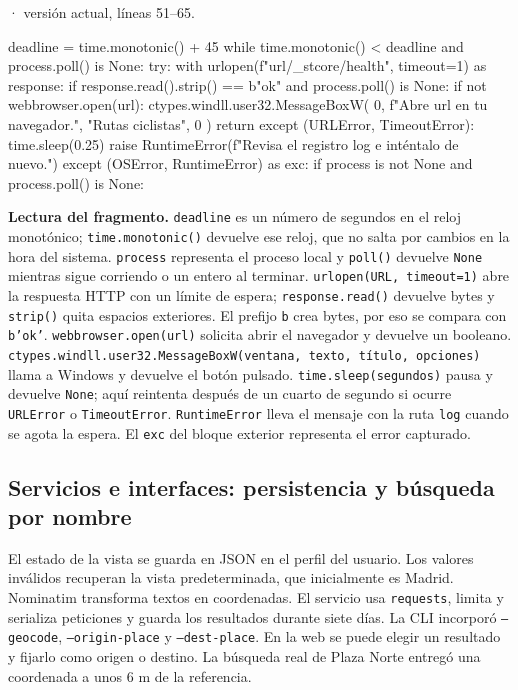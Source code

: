 \documentclass[11pt,a4paper]{article}
\begin{document}
\smallskip
{\footnotesize\texttt{} · versión actual, líneas 51--65.}\par
\begin{Codigo}[firstnumber=51]
        deadline = time.monotonic() + 45
        while time.monotonic() < deadline and process.poll() is None:
            try:
                with urlopen(f"{url}/_stcore/health", timeout=1) as response:
                    if response.read().strip() == b"ok" and process.poll() is None:
                        if not webbrowser.open(url):
                            ctypes.windll.user32.MessageBoxW(
                                0, f"Abre {url} en tu navegador.", "Rutas ciclistas", 0
                            )
                        return
            except (URLError, TimeoutError):
                time.sleep(0.25)
        raise RuntimeError(f"Revisa el registro {log} e inténtalo de nuevo.")
    except (OSError, RuntimeError) as exc:
        if process is not None and process.poll() is None:
\end{Codigo}

\textbf{Lectura del fragmento.} \texttt{deadline} es un número de segundos en el reloj monotónico; \texttt{time.monotonic()} devuelve ese reloj, que no salta por cambios en la hora del sistema. \texttt{process} representa el proceso local y \texttt{poll()} devuelve \texttt{None} mientras sigue corriendo o un entero al terminar. \texttt{urlopen(URL, timeout=1)} abre la respuesta HTTP con un límite de espera; \texttt{response.read()} devuelve bytes y \texttt{strip()} quita espacios exteriores. El prefijo \texttt{b} crea bytes, por eso se compara con \texttt{b'ok'}. \texttt{webbrowser.open(url)} solicita abrir el navegador y devuelve un booleano. \texttt{ctypes.windll.user32.MessageBoxW(ventana, texto, título, opciones)} llama a Windows y devuelve el botón pulsado. \texttt{time.sleep(segundos)} pausa y devuelve \texttt{None}; aquí reintenta después de un cuarto de segundo si ocurre \texttt{URLError} o \texttt{TimeoutError}. \texttt{RuntimeError} lleva el mensaje con la ruta \texttt{log} cuando se agota la espera. El \texttt{exc} del bloque exterior representa el error capturado.


\subsection{Servicios e interfaces: persistencia y búsqueda por nombre}
El estado de la vista se guarda en JSON en el perfil del usuario. Los valores inválidos recuperan la vista predeterminada, que inicialmente es Madrid. Nominatim transforma textos en coordenadas. El servicio usa \texttt{requests}, limita y serializa peticiones y guarda los resultados durante siete días. La CLI incorporó \texttt{--geocode}, \texttt{--origin-place} y \texttt{--dest-place}. En la web se puede elegir un resultado y fijarlo como origen o destino. La búsqueda real de Plaza Norte entregó una coordenada a unos 6 m de la referencia.
\end{document}
